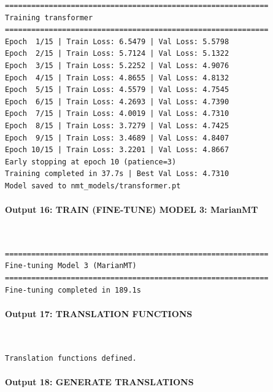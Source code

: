 \documentclass[12pt,a4paper,oneside]{report}
\begin{document}
\begin{Verbatim}[commandchars=\\\{\},breaklines=true,breakanywhere=true,fontsize=\scriptsize,frame=leftline,framesep=2mm,rulecolor=\color{gray}]
============================================================
Training transformer
============================================================
Epoch  1/15 | Train Loss: 6.5479 | Val Loss: 5.5798
Epoch  2/15 | Train Loss: 5.7124 | Val Loss: 5.1322
Epoch  3/15 | Train Loss: 5.2252 | Val Loss: 4.9076
Epoch  4/15 | Train Loss: 4.8655 | Val Loss: 4.8132
Epoch  5/15 | Train Loss: 4.5579 | Val Loss: 4.7545
Epoch  6/15 | Train Loss: 4.2693 | Val Loss: 4.7390
Epoch  7/15 | Train Loss: 4.0019 | Val Loss: 4.7310
Epoch  8/15 | Train Loss: 3.7279 | Val Loss: 4.7425
Epoch  9/15 | Train Loss: 3.4689 | Val Loss: 4.8407
Epoch 10/15 | Train Loss: 3.2201 | Val Loss: 4.8667
Early stopping at epoch 10 (patience=3)
Training completed in 37.7s | Best Val Loss: 4.7310
Model saved to nmt_models/transformer.pt
\end{Verbatim}
\paragraph{Output 16: TRAIN (FINE-TUNE) MODEL 3: MarianMT}\mbox{}\\[-1ex]
\begin{Verbatim}[commandchars=\\\{\},breaklines=true,breakanywhere=true,fontsize=\scriptsize,frame=leftline,framesep=2mm,rulecolor=\color{gray}]
============================================================
Fine-tuning Model 3 (MarianMT)
============================================================
Fine-tuning completed in 189.1s
\end{Verbatim}
\paragraph{Output 17: TRANSLATION FUNCTIONS}\mbox{}\\[-1ex]
\begin{Verbatim}[commandchars=\\\{\},breaklines=true,breakanywhere=true,fontsize=\scriptsize,frame=leftline,framesep=2mm,rulecolor=\color{gray}]
Translation functions defined.
\end{Verbatim}
\paragraph{Output 18: GENERATE TRANSLATIONS}\mbox{}\\[-1ex]
\end{document}
